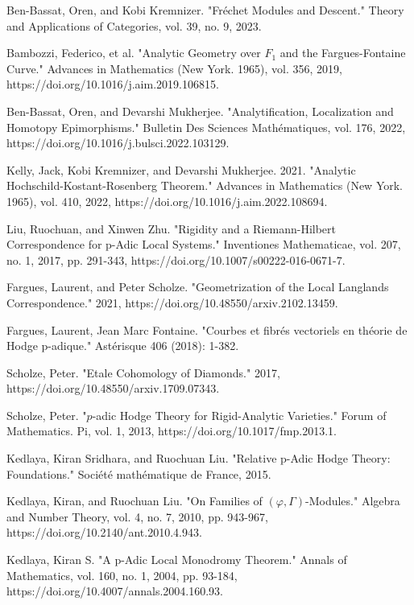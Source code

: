 \documentclass[12pt]{book}
\theoremstyle{definition}
\begin{document}
\begin{thebibliography}{}
 Ben-Bassat, Oren, and Kobi Kremnizer. "Fr\'echet Modules and Descent." Theory and Applications of Categories, vol. 39, no. 9, 2023.

 Bambozzi, Federico, et al. "Analytic Geometry over $F_1$ and the Fargues-Fontaine Curve." Advances in Mathematics (New York. 1965), vol. 356, 2019, https://doi.org/10.1016/j.aim.2019.106815.

 Ben-Bassat, Oren, and Devarshi Mukherjee. "Analytification, Localization and Homotopy Epimorphisms." Bulletin Des Sciences Math\'ematiques, vol. 176, 2022, https://doi.org/10.1016/j.bulsci.2022.103129.

 Kelly, Jack, Kobi Kremnizer, and Devarshi Mukherjee. 2021. "Analytic Hochschild-Kostant-Rosenberg Theorem." Advances in Mathematics (New York. 1965), vol. 410, 2022, https://doi.org/10.1016/j.aim.2022.108694.

 Liu, Ruochuan, and Xinwen Zhu. "Rigidity and a Riemann-Hilbert Correspondence for p-Adic Local Systems." Inventiones Mathematicae, vol. 207, no. 1, 2017, pp. 291-343, https://doi.org/10.1007/s00222-016-0671-7.

 Fargues, Laurent, and Peter Scholze. "Geometrization of the Local Langlands Correspondence." 2021, https://doi.org/10.48550/arxiv.2102.13459.
 
 Fargues, Laurent, Jean Marc Fontaine. "Courbes et fibr\'es vectoriels en th\'eorie de Hodge p-adique." Ast\'erisque 406 (2018): 1-382.

 Scholze, Peter. "Etale Cohomology of Diamonds." 2017, https://doi.org/10.48550/arxiv.1709.07343.

 Scholze, Peter. "$p$-adic Hodge Theory for Rigid-Analytic Varieties." Forum of Mathematics. Pi, vol. 1, 2013, https://doi.org/10.1017/fmp.2013.1.

 Kedlaya, Kiran Sridhara, and Ruochuan Liu. "Relative p-Adic Hodge Theory: Foundations." Soci\'et\'e math\'ematique de France, 2015.

 Kedlaya, Kiran, and Ruochuan Liu. "On Families of $(\varphi, \Gamma)$-Modules." Algebra and Number Theory, vol. 4, no. 7, 2010, pp. 943-967, https://doi.org/10.2140/ant.2010.4.943.

 Kedlaya, Kiran S. "A p-Adic Local Monodromy Theorem." Annals of Mathematics, vol. 160, no. 1, 2004, pp. 93-184, https://doi.org/10.4007/annals.2004.160.93.


\end{thebibliography}
\end{document}
